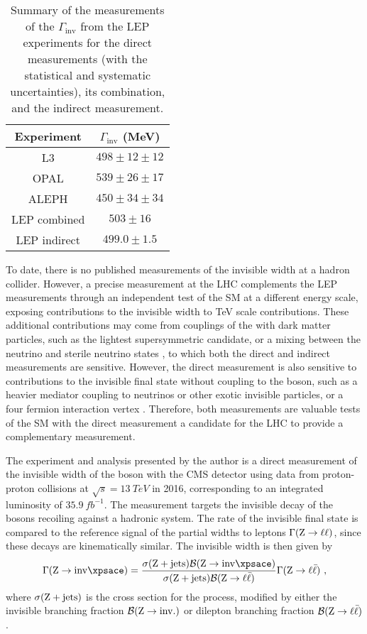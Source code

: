 \begin{table}[htb]
    \centering
    \begin{tabular}{cc}
         \hline\hline
         Experiment & $\Gamma_{\mathrm{inv}}$ (MeV) \\
         \hline
         L3 & $498\pm 12\pm 12$ \\
         OPAL & $539\pm 26\pm 17$ \\
         ALEPH & $450\pm 34\pm 34$ \\
         LEP combined & $503\pm 16$ \\
         \hline
         LEP indirect & $499.0\pm 1.5$ \\
         \hline
    \end{tabular}
    \caption{
        Summary of the measurements of the $\Gamma_{\mathrm{inv}}$ from the LEP experiments for the direct measurements (with the statistical and systematic uncertainties), its combination, and the indirect measurement.
    }
    \label{tab:lep-zinv-width}
\end{table}

To date, there is no published measurements of the \PZ invisible width at a hadron collider. However, a precise measurement at the LHC complements the LEP measurements through an independent test of the SM at a different energy scale, exposing contributions to the invisible width to TeV scale contributions. These additional contributions may come from couplings of the \PZ with dark matter particles, such as the lightest supersymmetric candidate, or a mixing between the neutrino and sterile neutrino states \cite{Carena:2003aj}, to which both the direct and indirect measurements are sensitive. However, the direct measurement is also sensitive to contributions to the invisible final state without coupling to the \PZ boson, such as a heavier mediator coupling to neutrinos or other exotic invisible particles, or a four fermion interaction vertex \cite{Carena:2003aj}.  Therefore, both measurements are valuable tests of the SM with the direct measurement a candidate for the LHC to provide a complementary measurement.

The experiment and analysis presented by the author is a direct measurement of the invisible width of the \PZ boson with the CMS detector using data from proton-proton collisions at ${\sqrt{s}=\SI{13}{TeV}}$ in 2016, corresponding to an integrated luminosity of $\SI{35.9}{fb^{-1}}$. The measurement targets the invisible decay of the \PZ bosons recoiling against a hadronic system. The rate of the invisible final state is compared to the reference signal of the partial widths to leptons $\Gamma(\mathrm{Z}\rightarrow\ell\ell)$, since these decays are kinematically similar. The invisible width is then given by
%
\begin{equation}\label{eq:zinv}
    \Gamma(\IZinv) = \frac{\sigma(\IZj)\mathcal{B}(\IZinv)}{\sigma(\IZj)\mathcal{B}(\IZll)}\Gamma(\IZll)\ ,
\end{equation}
%
where $\sigma({\mathrm{Z}+\mathrm{jets}})$ is the cross section for the \IZj process, modified by either the invisible branching fraction $\mathcal{B}(\mathrm{Z}\rightarrow\mathrm{inv.})$ or dilepton branching fraction $\mathcal{B}({\mathrm{Z}\rightarrow \ell\bar{\ell}})$.

